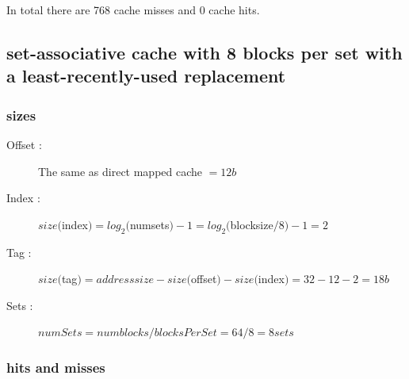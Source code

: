 \documentclass[12pt]{article}
\begin{document}
			In total there are 768 cache misses and 0 cache hits.

		\subsection{set-associative cache with 8 blocks per set with a least-recently-used replacement}

			\subsubsection{sizes}
			
				\begin{description}
					\item[Offset : ] The same as direct mapped cache $ = 12 b$
					\item[Index : ] $size($index$) = log_2($numsets$) -1 = log_2($blocksize$/8) - 1 = 2$
					\item[Tag : ] $size($tag$) = addresssize- size($offset$) - size($index$) = 32 - 12 -2 = 18b$
					\item[Sets : ] $numSets = numblocks / blocksPerSet = 64/8 = 8 sets$
				\end{description}

			\subsubsection{hits and misses}
			
\end{document}
